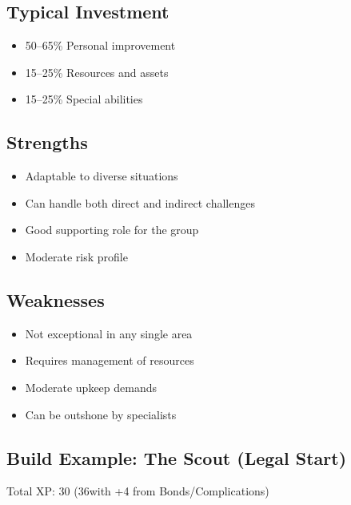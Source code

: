 \documentclass[11pt,twoside,openany]{book}
\begin{document}
\subsection*{Typical Investment}

\begin{itemize}
\item 50--65\% Personal improvement
\item 15--25\% Resources and assets
\item 15--25\% Special abilities
\end{itemize}

\subsection*{Strengths}

\begin{itemize}
\item Adaptable to diverse situations
\item Can handle both direct and indirect challenges
\item Good supporting role for the group
\item Moderate risk profile
\end{itemize}

\subsection*{Weaknesses}

\begin{itemize}
\item Not exceptional in any single area
\item Requires management of resources
\item Moderate upkeep demands
\item Can be outshone by specialists
\end{itemize}

\subsection*{Build Example: The Scout (Legal Start)}

Total XP: 30 (36with +4 from Bonds/Complications)
\end{document}
